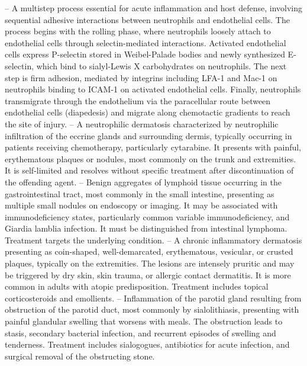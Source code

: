 -- A multistep process essential for acute inflammation and host defense, involving sequential adhesive interactions between neutrophils and endothelial cells. The process begins with the rolling phase, where neutrophils loosely attach to endothelial cells through selectin-mediated interactions. Activated endothelial cells express P-selectin stored in Weibel-Palade bodies and newly synthesized E-selectin, which bind to sialyl-Lewis X carbohydrates on neutrophils. The next step is firm adhesion, mediated by integrins including LFA-1 and Mac-1 on neutrophils binding to ICAM-1 on activated endothelial cells. Finally, neutrophils transmigrate through the endothelium via the paracellular route between endothelial cells (diapedesis) and migrate along chemotactic gradients to reach the site of injury.
-- A neutrophilic dermatosis characterized by neutrophilic infiltration of the eccrine glands and surrounding dermis, typically occurring in patients receiving chemotherapy, particularly cytarabine. It presents with painful, erythematous plaques or nodules, most commonly on the trunk and extremities. It is self-limited and resolves without specific treatment after discontinuation of the offending agent.
-- Benign aggregates of lymphoid tissue occurring in the gastrointestinal tract, most commonly in the small intestine, presenting as multiple small nodules on endoscopy or imaging. It may be associated with immunodeficiency states, particularly common variable immunodeficiency, and Giardia lamblia infection. It must be distinguished from intestinal lymphoma. Treatment targets the underlying condition.
-- A chronic inflammatory dermatosis presenting as coin-shaped, well-demarcated, erythematous, vesicular, or crusted plaques, typically on the extremities. The lesions are intensely pruritic and may be triggered by dry skin, skin trauma, or allergic contact dermatitis. It is more common in adults with atopic predisposition. Treatment includes topical corticosteroids and emollients.
-- Inflammation of the parotid gland resulting from obstruction of the parotid duct, most commonly by sialolithiasis, presenting with painful glandular swelling that worsens with meals. The obstruction leads to stasis, secondary bacterial infection, and recurrent episodes of swelling and tenderness. Treatment includes sialogogues, antibiotics for acute infection, and surgical removal of the obstructing stone.
